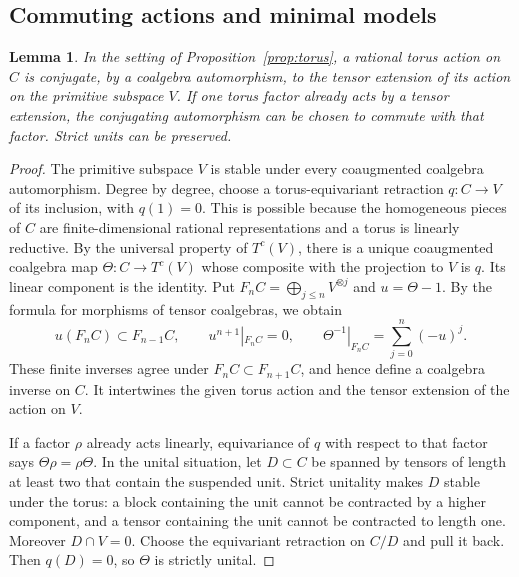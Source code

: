 \documentclass[12pt,a4paper,english,reqno]{amsart}
\theoremstyle{plain}
\newtheorem{lem}[thm]{Lemma}
\theoremstyle{definition}
\numberwithin{equation}{section}
\newcommand{\prpref}[1]{Proposition~\ref{#1}}
\def\ro{\rho}
\def\Th{\Theta}
\def\ox{\otimes}
\def\Ds{\bigoplus}
\begin{document}
\subsection{Commuting actions and minimal models}
\begin{lem}\label{lem:linear}
In the setting of \prpref{prop:torus}, a rational torus action on $C$ is conjugate, by a coalgebra automorphism, to the tensor extension of its action on the primitive subspace $V$. If one torus factor already acts by a tensor extension, the conjugating automorphism can be chosen to commute with that factor. Strict units can be preserved.
\end{lem}
\begin{proof}
The primitive subspace $V$ is stable under every coaugmented coalgebra automorphism. Degree by degree, choose a torus-equivariant retraction $q:C\to V$ of its inclusion, with $q(1)=0$. This is possible because the homogeneous pieces of $C$ are finite-dimensional rational representations and a torus is linearly reductive. By the universal property of $T^c(V)$, there is a unique coaugmented coalgebra map $\Th:C\to T^c(V)$ whose composite with the projection to $V$ is $q$. Its linear component is the identity. Put $F_nC=\Ds_{j\le n}V^{\ox j}$ and $u=\Th-1$. By the formula for morphisms of tensor coalgebras, we obtain
\[
 u(F_nC)\subset F_{n-1}C,\qquad u^{n+1}|_{F_nC}=0,\qquad
 \Th^{-1}|_{F_nC}=\sum_{j=0}^{n}(-u)^j.
\]
These finite inverses agree under $F_nC\subset F_{n+1}C$, and hence define a coalgebra inverse on $C$. It intertwines the given torus action and the tensor extension of the action on $V$.

If a factor $\ro$ already acts linearly, equivariance of $q$ with respect to that factor says $\Th\ro=\ro\Th$. In the unital situation, let $D\subset C$ be spanned by tensors of length at least two that contain the suspended unit. Strict unitality makes $D$ stable under the torus: a block containing the unit cannot be contracted by a higher component, and a tensor containing the unit cannot be contracted to length one. Moreover $D\cap V=0$. Choose the equivariant retraction on $C/D$ and pull it back. Then $q(D)=0$, so $\Th$ is strictly unital.
\end{proof}
\end{document}
